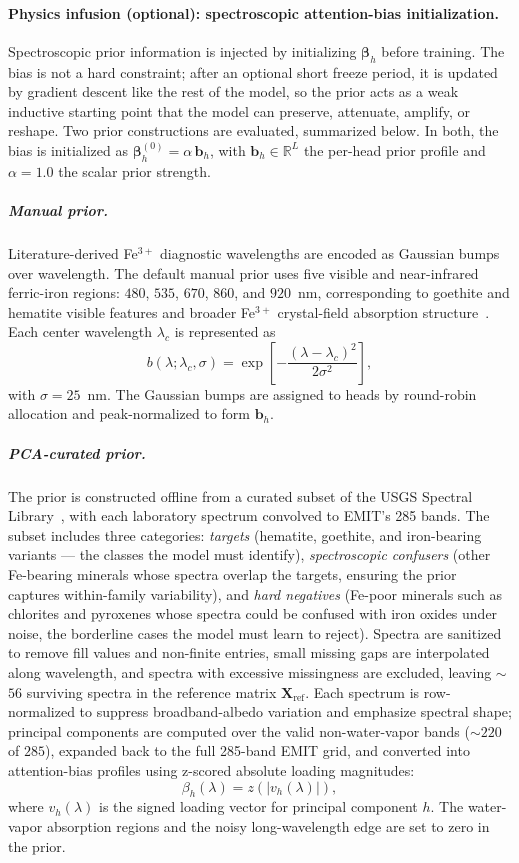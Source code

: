 \documentclass[11pt]{article}
\newcommand{\R}{\mathbb{R}}
\begin{document}
\paragraph{Physics infusion (optional): spectroscopic attention-bias initialization.}
Spectroscopic prior information is injected by initializing $\bm{\beta}_h$ before training.
The bias is not a hard constraint; after an optional short freeze period, it is updated by gradient descent like the rest of the model, so the prior acts as a weak inductive starting point that the model can preserve, attenuate, amplify, or reshape.
Two prior constructions are evaluated, summarized below. In both, the bias is initialized as $\bm{\beta}_h^{(0)} = \alpha\,\mathbf{b}_h$, with $\mathbf{b}_h \in \R^{L}$ the per-head prior profile and $\alpha = 1.0$ the scalar prior strength.

\subparagraph{Manual prior.}
Literature-derived Fe$^{3+}$ diagnostic wavelengths are encoded as Gaussian bumps over wavelength.
The default manual prior uses five visible and near-infrared ferric-iron regions: $480$, $535$, $670$, $860$, and $920$~nm, corresponding to goethite and hematite visible features and broader Fe$^{3+}$ crystal-field absorption structure~\cite{Jiang2014AlGoethite, clark1999, sherman1985, burns1993}.
Each center wavelength $\lambda_c$ is represented as
\[
b(\lambda;\lambda_c,\sigma) = \exp\left[-\frac{(\lambda - \lambda_c)^2}{2\sigma^2}\right],
\]
with $\sigma = 25$~nm.
The Gaussian bumps are assigned to heads by round-robin allocation and peak-normalized to form $\mathbf{b}_h$.

\subparagraph{PCA-curated prior.}
The prior is constructed offline from a curated subset of the USGS Spectral Library~\cite{kokaly2017usgs}, with each laboratory spectrum convolved to EMIT's 285 bands.
The subset includes three categories: \emph{targets} (hematite, goethite, and iron-bearing variants --- the classes the model must identify), \emph{spectroscopic confusers} (other Fe-bearing minerals whose spectra overlap the targets, ensuring the prior captures within-family variability), and \emph{hard negatives} (Fe-poor minerals such as chlorites and pyroxenes whose spectra could be confused with iron oxides under noise, the borderline cases the model must learn to reject).
Spectra are sanitized to remove fill values and non-finite entries, small missing gaps are interpolated along wavelength, and spectra with excessive missingness are excluded, leaving $\sim$$56$ surviving spectra in the reference matrix $\mathbf{X}_{\mathrm{ref}}$.
Each spectrum is row-normalized to suppress broadband-albedo variation and emphasize spectral shape; principal components are computed over the valid non-water-vapor bands ($\sim$$220$ of $285$), expanded back to the full 285-band EMIT grid, and converted into attention-bias profiles using z-scored absolute loading magnitudes:
\[
\beta_h(\lambda) = z\left(|v_h(\lambda)|\right),
\]
where $v_h(\lambda)$ is the signed loading vector for principal component $h$.
The water-vapor absorption regions and the noisy long-wavelength edge are set to zero in the prior.
\end{document}
